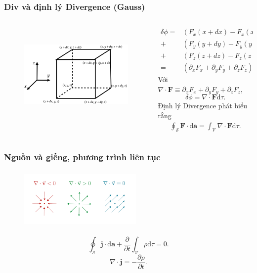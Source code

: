 \begin{frame}
    \frametitle{Div và định lý Divergence (Gauss)}
    \begin{columns}
        \begin{column}{0.6\textwidth}
            \begin{figure}
                \centering
                \includegraphics[width=8cm, height=5cm]{Content/Figure/infinitesimal_cube.png}
            \end{figure}
        \end{column}
        \begin{column}{0.4\textwidth}
            \scriptsize
            \begin{align*}
                \delta\phi=& (F_{x}(x+dx)-F_{x}(x))dydz \\
                          +& (F_{y}(y+dy)-F_{y}(y))dxdz \\ 
                          +& (F_{z}(z+dz)-F_{z}(z))dxdy\\
                          =& (\partial_x F_x +\partial_y F_y +\partial_z F_z)dxdydz.
            \end{align*}
            Với \(\nabla\cdot\mathbf{F}\equiv \partial_x F_x +\partial_y F_y +\partial_z F_z ,\)
            \[\delta\phi=\nabla\cdot \mathbf{F}\text{d}\tau.\]
            Định lý Divergence phát biểu rằng
            \begin{align*}
                \oint_{\mathcal{S}}\mathbf{F}\cdot \text{d}\mathbf{a}=\int_{\mathcal{V}}\nabla\cdot\mathbf{F}\text{d}\tau.
            \end{align*}
            
        \end{column}
    \end{columns}
\end{frame}
\begin{frame}
    \frametitle{Nguồn và giếng, phương trình liên tục}
    \begin{figure}
        \centering
        \includegraphics[width=6cm, height=3cm]{Content/Figure/sourrce_fluid.png}
    \end{figure}
    \[\oint_{\mathcal{S}}\mathbf{j}\cdot\text{d}\mathbf{a}+\frac{\partial }{\partial t}\int_{\mathcal{V}}\rho \text{d}\tau =0.\]
    \[\nabla\cdot\mathbf{j}=-\frac{\partial \rho}{\partial t}.\]
\end{frame}
